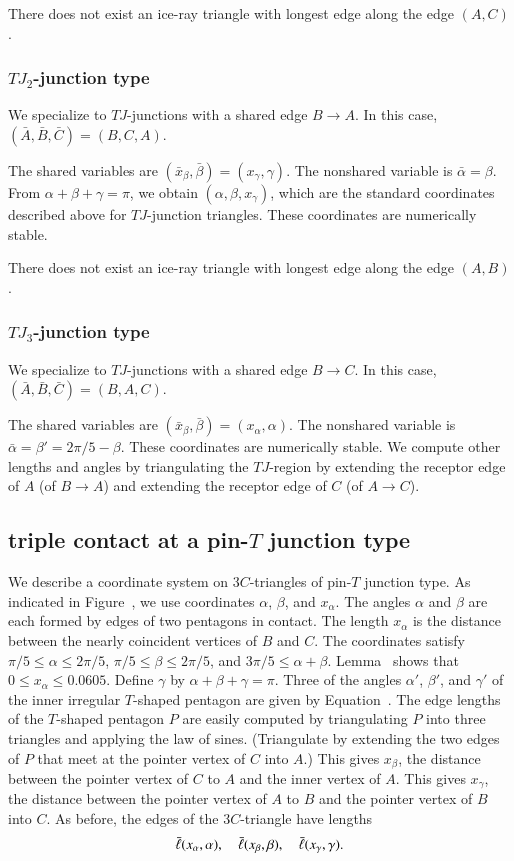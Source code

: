 There does not exist an ice-ray triangle with longest edge along the
edge $(A,C)$.

\subsubsection{$TJ_2$-junction type}

We specialize to $TJ$-junctions with a shared edge $B\to A$. In this
case, $(\bar A,\bar B,\bar C)=(B,C,A)$.

The shared variables are $(\bar x_\beta,\bar\beta)=(x_\gamma,\gamma)$.
The nonshared variable is $\bar\alpha =\beta$.  From
$\alpha+\beta+\gamma=\pi$, we obtain $(\alpha,\beta,x_\gamma)$, which
are the standard coordinates described above for $TJ$-junction
triangles.  These coordinates are numerically stable.

There does not exist an ice-ray triangle with longest edge along the
edge $(A,B)$.

\subsubsection{$TJ_3$-junction type}

We specialize to $TJ$-junctions with a shared edge $B\to C$.
In this case, $(\bar A,\bar B,\bar C)=(B,A,C)$.

The shared variables are $(\bar x_\beta,\bar\beta)=(x_\alpha,\alpha)$.
The nonshared variable is $\bar\alpha=\beta'=2\pi/5-\beta$.  These
coordinates are numerically stable.  We compute other lengths and
angles by triangulating the $TJ$-region by extending the receptor edge
of $A$ (of $B\to A$) and extending the receptor edge of $C$ (of $A\to
C$).

\subsection{triple contact at a pin-$T$ junction type}
We describe a coordinate system on $3C$-triangles of pin-$T$ junction
type.  As indicated in Figure~, we use coordinates
$\alpha$, $\beta$, and $x_\alpha$.  The angles $\alpha$ and $\beta$
are each formed by edges of two pentagons in contact.  The length
$x_\alpha$ is the distance between the nearly coincident vertices of
$B$ and $C$.  The coordinates satisfy $\pi/5 \le \alpha \le 2\pi/5$,
$\pi/5\le \beta \le 2\pi/5$, and $3\pi/5 \le \alpha+\beta$.
Lemma~ shows that $0\le x_\alpha\le 0.0605$.  Define
$\gamma$ by $\alpha+\beta+\gamma = \pi$.  Three of the angles
$\alpha'$, $\beta'$, and $\gamma'$ of the inner irregular $T$-shaped
pentagon are given by Equation~.  The edge lengths of the
$T$-shaped pentagon $P$ are easily computed by triangulating $P$ into
three triangles and applying the law of sines.  (Triangulate by
extending the two edges of $P$ that meet at the pointer vertex of $C$
into $A$.)  This gives $x_\beta$, the distance between the pointer
vertex of $C$ to $A$ and the inner vertex of $A$.  This gives
$x_\gamma$, the distance between the pointer vertex of $A$ to $B$ and
the pointer vertex of $B$ into $C$.  As before, the edges of the
$3C$-triangle have lengths
\[
\bar\ell(x_\alpha,\alpha),\quad \bar\ell(x_\beta,\beta),\quad \bar\ell(x_\gamma,\gamma).
\]

